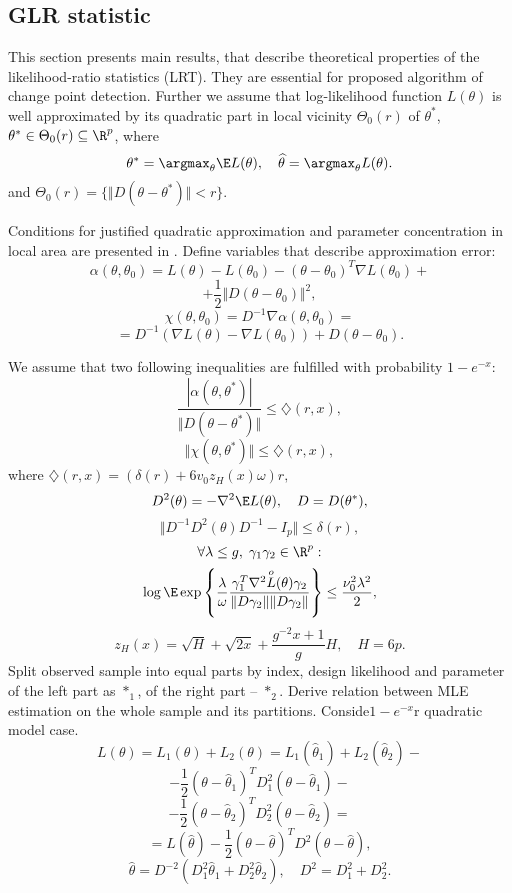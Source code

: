 \label{sec:theory}
\subsection{GLR statistic}
This section presents main results, that describe theoretical properties of the likelihood-ratio statistics (LRT). They are essential for proposed algorithm of change point detection. Further we assume that log-likelihood function $L(\theta)$ is well approximated by its quadratic part in local vicinity $\Theta_0(r)$  of $\theta^*$, $ \theta^* \in \Theta_0(r) \subseteq \R^p$, where
\[
\theta^* = \argmax_{\theta} \E L(\theta),
\quad
\widehat{\theta} = \argmax_{\theta} L(\theta).
\]
and $\Theta_0(r) = \{\Vert D (\theta - \theta^*) \Vert < r \}$.

Conditions for justified quadratic approximation and parameter concentration in local area are presented in \cite{wilks2013}.
Define variables that describe approximation error:
\[
  \alpha(\theta, \theta_0) = L(\theta) - L(\theta_0)   - (\theta - \theta_0)^T \nabla L( \theta_0) + 
\]
\[
+  \frac{1}{2} \Vert D (\theta - \theta_0) \Vert^2, 
\]
\[
\chi(\theta, \theta_0) = D^{-1} \nabla \alpha(\theta, \theta_0) = 
\]
\[
= D^{-1} (\nabla L(\theta) - \nabla L( \theta_0) ) +  D (\theta - \theta_0). 
\]


We assume that two following inequalities are fulfilled with probability $1 - e^{-x}$:
\[\tag{a}
\frac{| \alpha(\theta, \theta^*)  |}{\Vert D(\theta - \theta^*) \Vert} \leq \diamondsuit (r, x),  
\]
\[
  \Vert \chi(\theta, \theta^*) \Vert \leq  \diamondsuit (r, x),
\]
where $\diamondsuit (r, x) = (\delta (r) + 6 v_0 z_H(x) \omega ) r,$
\[
D^2(\theta) = - \nabla^2 \E L (\theta),
\quad
D = D(\theta^*),
\]
\[
\Vert D^{-1} D^2(\theta) D^{-1} - I_p\Vert \leq \delta(r),
\]
\[
\forall \lambda \leq g, \; \gamma_1 \gamma_2 \in \R^p:
\]
\[
\log \E \exp \left\{
\frac{\lambda}{\omega} \frac{\gamma_1^T \nabla^2 \overset{o}{L}(\theta) \gamma_2}{\Vert D \gamma_2 \Vert \Vert D \gamma_2 \Vert}
\right\} \leq 
\frac{\nu_0^2 \lambda^2}{2},
\]
\[
z_H(x) = \sqrt{H} + \sqrt{2x} + \frac{g^{-2} x + 1}{g} H, 
\quad H = 6p.
\]
Split observed sample into equal parts by index, design likelihood and parameter of the left part as $*_{1}$, of the right part --  $*_{2}$. 
Derive relation between MLE estimation on the whole sample and its partitions. Conside$1 - e^{-x}$r quadratic model case. 
\[
L(\theta) = L_1(\theta) + L_2(\theta) = L_1(\widehat{\theta}_1) + L_2(\widehat{\theta}_2) - 
\]
\[ -  \frac{1}{2} (\theta - \widehat{\theta}_1)^T D_1^2  (\theta - \widehat{\theta}_1)
- 
\]
\[-\frac{1}{2} (\theta - \widehat{\theta}_2)^T D_2^2  (\theta - \widehat{\theta}_2)  =
\]     
\[
 = L(\widehat{\theta}) - \frac{1}{2} (\theta - \widehat{\theta})^T D^2  (\theta - \widehat{\theta}),
\]
\[
\widehat{\theta} = D^{-2} (D_1^2 \widehat{\theta}_1 + D_2^2 \widehat{\theta}_2 ),
\quad D^2 = D_1^2 + D_2^2.
\]    


